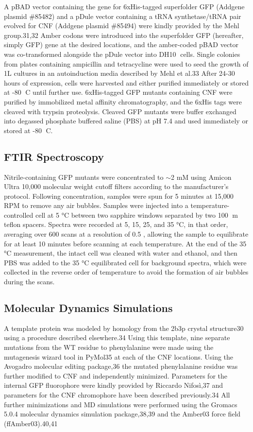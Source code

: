 A pBAD vector containing the gene for 6xHis-tagged superfolder GFP (Addgene plasmid \#85482) and a pDule vector containing a tRNA synthetase/tRNA pair evolved for CNF (Addgene plasmid \#85494) were kindly provided by the Mehl group.31,32
Amber codons were introduced into the superfolder GFP (hereafter, simply GFP) gene at the desired locations, and the amber-coded pBAD vector was co-transformed alongside the pDule vector into DH10 cells.
Single colonies from plates containing ampicillin and tetracycline were used to seed the growth of 1L cultures in an autoinduction media described by Mehl et al.33
After 24-30 hours of expression, cells were harvested and either purified immediately or stored at -80 C until further use.
6xHis-tagged GFP mutants containing CNF were purified by immobilized metal affinity chromatography, and the 6xHis tags were cleaved with trypsin proteolysis.
Cleaved GFP mutants were buffer exchanged into degassed phosphate buffered saline (PBS) at pH 7.4 and used immediately or stored at -80 C. 

\subsection{FTIR Spectroscopy}

Nitrile-containing GFP mutants were concentrated to $\sim$2 mM using Amicon Ultra 10,000 molecular weight cutoff filters according to the manufacturer's protocol.
Following concentration, samples were spun for 5 minutes at 15,000 RPM to remove any air bubbles.
Samples were injected into a temperature-controlled cell at 5 \si{\celsius} between two sapphire windows separated by two 100 m teflon spacers.
Spectra were recorded at 5, 15, 25, and 35 \si{\celsius}, in that order, averaging over 600 scans at a resolution of 0.5 \si{\wn}, allowing the sample to equilibrate for at least 10 minutes before scanning at each temperature.
At the end of the 35 \si{\celsius} measurement, the intact cell was cleaned with water and ethanol, and then PBS was added to the 35 \si{\celsius} equilibrated cell for background spectra, which were collected in the reverse order of temperature to avoid the formation of air bubbles during the scans.

\subsection{Molecular Dynamics Simulations}

A template protein was modeled by homology from the 2b3p crystal structure30 using a procedure described elsewhere.34
Using this template, nine separate mutations from the WT residue to phenylalanine were made using the mutagenesis wizard tool in PyMol35 at each of the CNF locations.
Using the Avogadro molecular editing package,36 the mutated phenylalanine residue was further modified to CNF and independently minimized.
Parameters for the internal GFP fluorophore were kindly provided by Riccardo Nifosì,37 and parameters for the CNF chromophore have been described previously.34
All further minimizations and MD simulations were performed using the Gromacs 5.0.4 molecular dynamics simulation package,38,39 and the Amber03 force field (ffAmber03).40,41 

